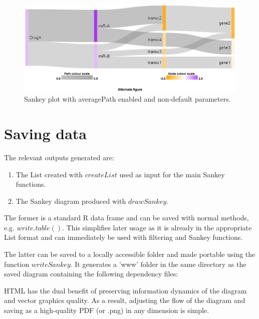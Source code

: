 \documentclass[a4paper]{article}
\begin{document}
\begin{figure}[htbp]
    \begin{center}
    \includegraphics[width=\textwidth]{figure3.png}
    \caption{Sankey plot with averagePath enabled and non-default parameters.}
    \label{fig:Custom}
    \end{center}
\end{figure}

\section{Saving data}
The relevant outputs generated are:
\begin{enumerate}
    \item The List created with $createList$ used as input for the main Sankey functions.
    \item The Sankey diagram produced with $drawSankey$.
\end{enumerate}
The former is a standard R data frame and can be saved with normal methods, e.g. $write.table()$. This simplifies later usage as it is already in the appropriate List format and can immediately be used with filtering and Sankey functions.

The latter can be saved to a locally accessible folder and made portable using the function $writeSankey$. It generates a 'www' folder in the same directory as the saved diagram containing the following dependency files:

HTML has the dual benefit of preserving information dynamics of the diagram and vector graphics quality. As a result, adjusting the flow of the diagram and saving as a high-quality PDF (or .png) in any dimension is simple.
\end{document}
